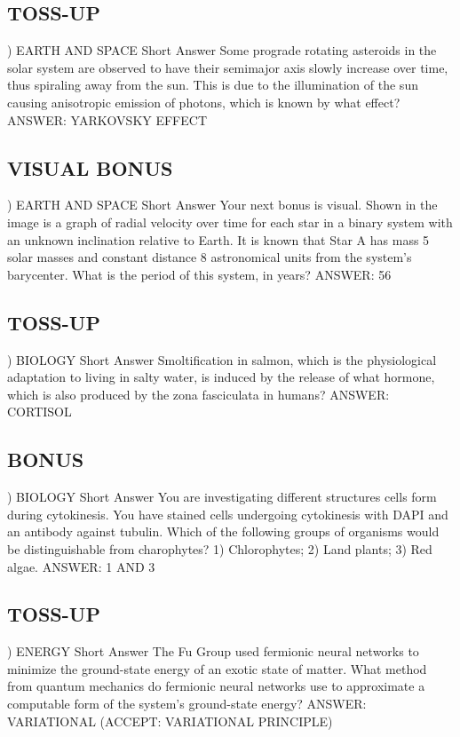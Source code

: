 \documentclass{article}
\begin{document}
\subsection*{TOSS-UP}
) EARTH AND SPACE Short Answer Some prograde rotating asteroids in the solar system are observed to have their semimajor axis slowly increase over time, thus spiraling away from the sun. This is due to the illumination of the sun causing anisotropic emission of photons, which is known by what effect?
\noindent ANSWER: YARKOVSKY EFFECT

\subsection*{VISUAL BONUS}
) EARTH AND SPACE Short Answer Your next bonus is visual. Shown in the image is a graph of radial velocity over time for each star in a binary system with an unknown inclination relative to Earth. It is known that Star A has mass 5 solar masses and constant distance 8 astronomical units from the system's barycenter. What is the period of this system, in years?
\noindent ANSWER: 56

\subsection*{TOSS-UP}
) BIOLOGY Short Answer Smoltification in salmon, which is the physiological adaptation to living in salty water, is induced by the release of what hormone, which is also produced by the zona fasciculata in humans?
\noindent ANSWER: CORTISOL

\subsection*{BONUS}
) BIOLOGY Short Answer You are investigating different structures cells form during cytokinesis. You have stained cells undergoing cytokinesis with DAPI and an antibody against tubulin. Which of the following groups of organisms would be distinguishable from charophytes? 1) Chlorophytes; 2) Land plants; 3) Red algae.
\noindent ANSWER: 1 AND 3

\subsection*{TOSS-UP}
) ENERGY Short Answer The Fu Group used fermionic neural networks to minimize the ground-state energy of an exotic state of matter. What method from quantum mechanics do fermionic neural networks use to approximate a computable form of the system's ground-state energy?
\noindent ANSWER: VARIATIONAL (ACCEPT: VARIATIONAL PRINCIPLE)
\end{document}
